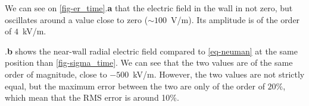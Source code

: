   We can see on \cref{fig-er_time}.{\bf a} that the electric field in the wall in not zero, but oscillates around a value close to zero ($\sim 100$~V/m).
  Its amplitude is of the order of $4$~kV/m.
  
  .{\bf b} shows the near-wall  radial electric field compared to \cref{eq-neuman} at the same position than \cref{fig-sigma_time}.
  We can see that the two values are of the same order of magnitude, close to $-500$~kV/m.
  However, the two values are not strictly equal, but the maximum error between the two are only of the order of $20\%$, which mean that the \ac{RMS} error is around 10\%.
  
